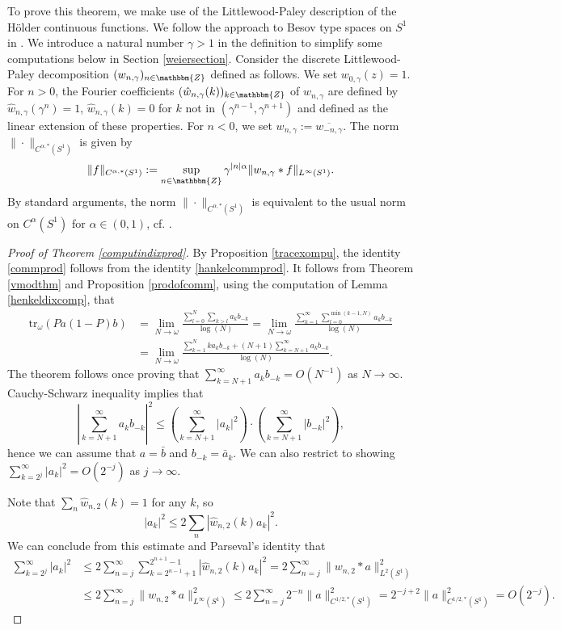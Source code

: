 \documentclass[10pt]{amsart}
\theoremstyle{remark}
\theoremstyle{definition}
\begin{document}
To prove this theorem, we make use of the Littlewood-Paley description of the H\"older continuous functions. We follow the approach to Besov type spaces on $S^1$ in \cite{peller}. We introduce a natural number $\gamma>1$ in the definition to simplify some computations below in Section \ref{weiersection}. Consider the discrete Littlewood-Paley decomposition $(w_{n,\gamma})_{n\in {\mathbbm{Z}}}$ defined as follows. We set $w_{0,\gamma}(z)=1$. 
\label{lptheoryontorus}
For $n>0$, the Fourier coefficients $(\hat{w}_{n,\gamma}(k))_{k\in {\mathbbm{Z}}}$ of $w_{n,\gamma}$ are defined by $\hat{w}_{n,\gamma}(\gamma^n)=1$, $\hat{w}_{n,\gamma}(k)=0$ for $k$ not in $(\gamma^{n-1},\gamma^{n+1})$ and defined as the linear extension of these properties. For $n<0$, we set $w_{n,\gamma}:=\overline{w_{-n,\gamma}}$. The norm $\|\cdot\|_{C^{\alpha,*}(S^1)}$ is given by 
$$\|f\|_{C^{\alpha,*}(S^1)}:=\sup_{n\in {\mathbbm{Z}}}\gamma^{|n|\alpha}\|w_{n,\gamma}*f\|_{L^\infty(S^1)}.$$
By standard arguments, the norm $\|\cdot\|_{C^{\alpha,*}(S^1)}$ is equivalent to the usual norm on $C^\alpha(S^1)$ for $\alpha\in (0,1)$, cf. \cite[Theorem 6.1]{abelsbook}.

\begin{proof}[Proof of Theorem \ref{computindixprod}]
By Proposition \ref{tracexompu}, the identity \eqref{commprod} follows from the identity \eqref{hankelcommprod}. It follows from Theorem \ref{vmodthm} and Proposition \ref{prodofcomm}, using the computation of Lemma \ref{henkeldixcomp}, that 
\begin{align*}
{\mathrm{t}\mathrm{r}}_\omega(Pa(1-P)b)&=\lim_{N\to \omega}\frac{\sum_{l=0}^N\sum_{k>l} a_{k}b_{-k}}{\log(N)}=\lim_{N\to \omega}\frac{\sum_{k=1}^\infty\sum_{l=0}^{\min(k-1,N)} a_{k}b_{-k}}{\log(N)}\\
&=\lim_{N\to \omega}\frac{\sum_{k=1}^Nka_{k}b_{-k}+(N+1)\sum_{k=N+1}^\infty a_{k}b_{-k}}{\log(N)}.
\end{align*}
The theorem follows once proving that $\sum_{k=N+1}^\infty a_{k}b_{-k}=O(N^{-1})$ as $N\to \infty$. Cauchy-Schwarz inequality implies that 
$$\left|\sum_{k=N+1}^\infty a_{k}b_{-k}\right|^2\leq \left(\sum_{k=N+1}^\infty |a_{k}|^2\right)\cdot \left(\sum_{k=N+1}^\infty |b_{-k}|^2\right),$$
hence we can assume that $a=\bar{b}$ and $b_{-k}=\bar{a}_k$. We can also restrict to showing $\sum_{k=2^{j}}^\infty |a_{k}|^2=O(2^{-j})$ as $j\to \infty$. 

Note that $\sum_n\hat{w}_{n,2}(k)=1$ for any $k$, so 
$$|a_k|^2\leq 2\sum_n|\hat{w}_{n,2}(k)a_k|^2.$$
We can conclude from this estimate and Parseval's identity that 
\begin{align*}
\sum_{k=2^{j}}^\infty |a_{k}|^2&\leq 2\sum_{n=j}^\infty \sum_{k=2^{n-1}+1}^{2^{n+1}-1}|\hat{w}_{n,2}(k)a_k|^2=2\sum_{n=j}^\infty\|w_{n,2}*a\|_{L^2(S^1)}^2\\
&\leq2\sum_{n=j}^\infty\|w_{n,2}*a\|_{L^\infty(S^1)}^2 \leq 2\sum_{n=j}^\infty 2^{-n}\|a\|_{C^{1/2,*}(S^1)}^2=2^{-j+2}\|a\|_{C^{1/2,*}(S^1)}^2=O(2^{-j}).
\end{align*}

\end{proof}
\end{document}
